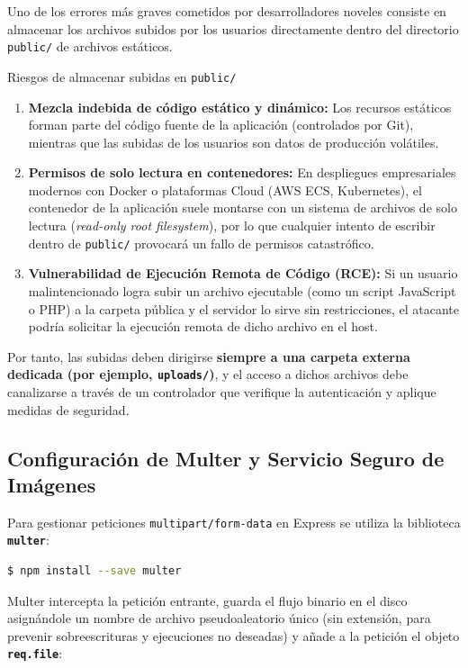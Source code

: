 Uno de los errores más graves cometidos por desarrolladores noveles consiste en almacenar los archivos subidos por los usuarios directamente dentro del directorio \texttt{public/} de archivos estáticos. 

\begin{importante}{Riesgos de almacenar subidas en \texttt{public/}}
\begin{enumerate}
    \item \textbf{Mezcla indebida de código estático y dinámico:} Los recursos estáticos forman parte del código fuente de la aplicación (controlados por Git), mientras que las subidas de los usuarios son datos de producción volátiles.
    \item \textbf{Permisos de solo lectura en contenedores:} En despliegues empresariales modernos con Docker o plataformas Cloud (AWS ECS, Kubernetes), el contenedor de la aplicación suele montarse con un sistema de archivos de solo lectura (\emph{read-only root filesystem}), por lo que cualquier intento de escribir dentro de \texttt{public/} provocará un fallo de permisos catastrófico.
    \item \textbf{Vulnerabilidad de Ejecución Remota de Código (RCE):} Si un usuario malintencionado logra subir un archivo ejecutable (como un script JavaScript o PHP) a la carpeta pública y el servidor lo sirve sin restricciones, el atacante podría solicitar la ejecución remota de dicho archivo en el host.
\end{enumerate}
Por tanto, las subidas deben dirigirse \textbf{siempre a una carpeta externa dedicada (por ejemplo, \texttt{uploads/})}, y el acceso a dichos archivos debe canalizarse a través de un controlador que verifique la autenticación y aplique medidas de seguridad.
\end{importante}

\subsection{Configuración de Multer y Servicio Seguro de Imágenes}

Para gestionar peticiones \texttt{multipart/form-data} en Express se utiliza la biblioteca \textbf{\texttt{multer}}:
\begin{lstlisting}[language=bash]
$ npm install --save multer
\end{lstlisting}

Multer intercepta la petición entrante, guarda el flujo binario en el disco asignándole un nombre de archivo pseudoaleatorio único (sin extensión, para prevenir sobreescrituras y ejecuciones no deseadas) y añade a la petición el objeto \textbf{\texttt{req.file}}:

